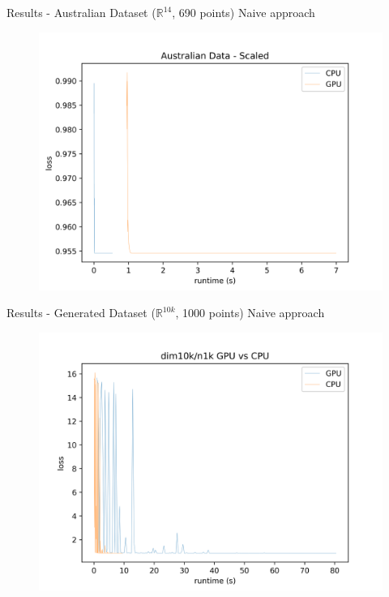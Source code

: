 \documentclass{beamer}
\def \R {\mathbb{R}}
\def \R {\mathbb{R}}
\begin{document}
\begin{frame}{Results - Australian Dataset ($\R^{14}$, 690 points)}
  Naive approach\\
  \begin{figure}
    \includegraphics[scale=0.5]{cpu_vs_gpu}
\end{figure}
\end{frame}

\begin{frame}{Results - Generated Dataset ($\R^{10k}$, 1000 points)}
  Naive approach\\
  \begin{figure}
    \includegraphics[scale=0.5]{dim10k_CPU_GPU}
\end{figure}
\end{frame}
\end{document}
